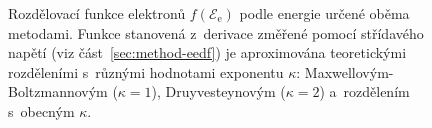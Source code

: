 \documentclass{protokol}
\newcommand\enelec{\mathcal E_\mathrm{e}}
\newcommand\eedf{f(\enelec)}
\begin{document}
\begin{figure}[p]
	\centering
	
	\par\smallskip
	
	\par\smallskip
	
	\caption{Rozdělovací funkce elektronů $\eedf$ podle energie určené
		oběma metodami.
		Funkce stanovená z~derivace změřené pomocí střídavého napětí
		(viz část~\ref{sec:method-eedf})
		je aproximována teoretickými rozděleními s~různými hodnotami
		exponentu $\kappa$:
		Maxwellovým-Boltzmannovým ($\kappa = 1$),
		Druyvesteynovým ($\kappa = 2$)
		a~rozdělením s~obecným $\kappa$.}
	\label{fig:eedf}
\end{figure}

\printbibliography
\end{document}
